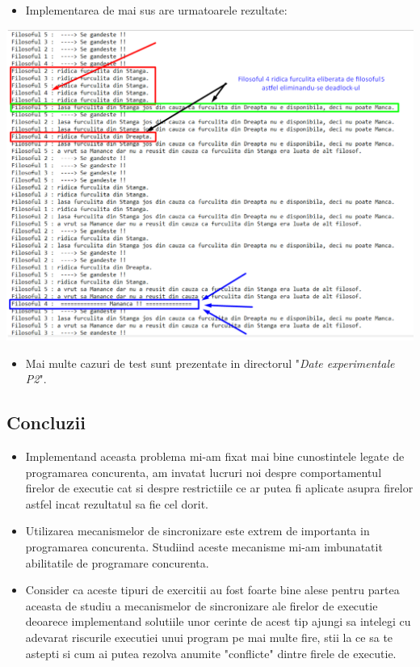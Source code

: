 \documentclass[14pt]{article}
\begin{document}
\newpage

\begin{itemize}
\item Implementarea de mai sus are urmatoarele rezultate: 
\end{itemize}

\begin{center}\includegraphics[height=3.9 in, width = 4.9 in]{filosofi_run.png}
\end{center}

\begin{itemize}
\item Mai multe cazuri de test sunt prezentate in directorul "\textit{Date experimentale P2}".
\end{itemize}


\subsection{\textbf{Concluzii}}

\begin{itemize}
\item Implementand aceasta problema mi-am fixat mai bine cunostintele legate de programarea concurenta, am invatat lucruri noi despre comportamentul firelor de executie cat si despre restrictiile ce ar putea fi aplicate asupra firelor astfel incat rezultatul sa fie cel dorit.

\item Utilizarea mecanismelor de sincronizare este extrem de importanta in programarea concurenta. Studiind aceste mecanisme mi-am imbunatatit abilitatile de programare concurenta.


\item Consider ca aceste tipuri de exercitii au fost foarte bine alese pentru partea aceasta de studiu a mecanismelor de sincronizare ale firelor de executie deoarece implementand solutiile unor  cerinte de acest tip ajungi sa intelegi cu adevarat riscurile executiei unui program pe mai multe fire, stii la ce sa te astepti si cum ai putea rezolva anumite "conflicte" dintre firele de executie.

\end{itemize}
\end{document}
